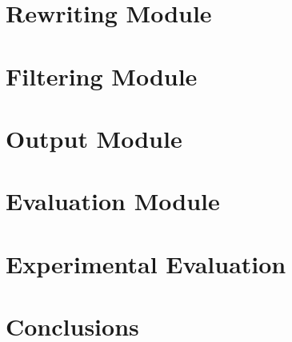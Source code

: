 \documentclass[pdftex]{pucthesis}	%
\begin{document}
\chapter[REWRITING MODULE]{Rewriting Module} \label{chpt:rewriting}


\chapter[FILTERING MODULE]{Filtering Module} \label{chpt:filtering}


\chapter[OUTPUT MODULE]{Output Module} \label{chpt:output}


\chapter[EVALUATION MODULE]{Evaluation Module} \label{chpt:evaluation}


\chapter[EXPERIMENTAL EVALUATION]{Experimental Evaluation} \label{chpt:experiments}


\chapter[CONCLUSIONS]{Conclusions} \label{chpt:conclusions}



\cleardoublepage
{} \label{references}

\renewcommand{\bibname}{REFERENCES}




% 
\end{document}
